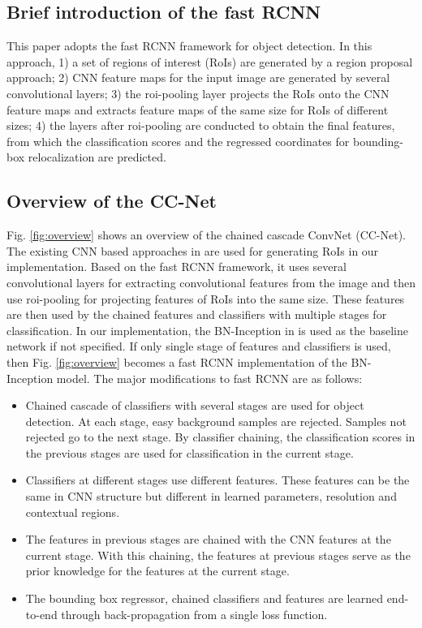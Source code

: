\documentclass[10pt,twocolumn,letterpaper]{article}
\begin{document}
\subsection{Brief introduction of the fast RCNN}
This paper adopts the fast RCNN framework for object detection. In this approach, 1) a set of regions of interest (RoIs) are generated by a region proposal approach; 2)  CNN feature maps for the input image are generated by several convolutional layers;  3) the roi-pooling layer projects the RoIs onto the CNN feature maps and extracts feature maps of the same size for RoIs of different sizes; 4) the layers after roi-pooling are conducted to obtain the final features, from which the classification scores and the regressed coordinates for bounding-box relocalization are predicted. 

\subsection{Overview of the CC-Net}
Fig. \ref{fig:overview} shows an overview of the chained cascade ConvNet (CC-Net). The existing CNN based approaches in \cite{yang2016craft, gidaris2016attend} are used for generating RoIs in our implementation. 
 Based on the fast RCNN framework, it uses several convolutional layers for extracting convolutional features from the image and then use roi-pooling for projecting features of RoIs into the same size. These features are then used by the chained features and classifiers with multiple stages for classification. In our implementation, the BN-Inception in \cite{ioffe2015batch} is used as the baseline network if not specified. If only single stage of features and classifiers is used, then Fig. \ref{fig:overview}  becomes a fast RCNN implementation of the BN-Inception model. The major modifications to fast RCNN are as follows:
\begin{itemize}
\item Chained cascade of classifiers with several stages are used for object detection. At each stage, easy background samples are rejected. Samples not rejected go to the next stage. By classifier chaining, the classification scores in the previous stages are used for  classification in the current stage.
\item Classifiers at different stages use different features. These features can be the same in CNN structure but different in learned parameters, resolution and contextual regions.
\item The features in previous stages are chained with the CNN features at the current stage. With this chaining, the features at previous stages serve as the prior knowledge for the features at the current stage. 
\item The bounding box regressor, chained classifiers and features are learned end-to-end through back-propagation from a single loss function.
\end{itemize}
\end{document}
